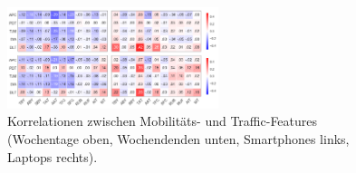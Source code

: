 \documentclass[12pt, a4paper]{article}
\begin{document}
\begin{appendix}
\begin{figure}[H]
    \centering
    \includegraphics[width=0.55\textwidth]{img/mobility_traffic_correlations.png}
    \caption{Korrelationen zwischen Mobilitäts- und Traffic-Features (Wochentage oben, Wochendenden unten,
    Smartphones links, Laptops rechts). \cite{Alipour2018}}
    \label{fig:mobility_traffic_correlations}
\end{figure}

\end{appendix}
\end{document}
